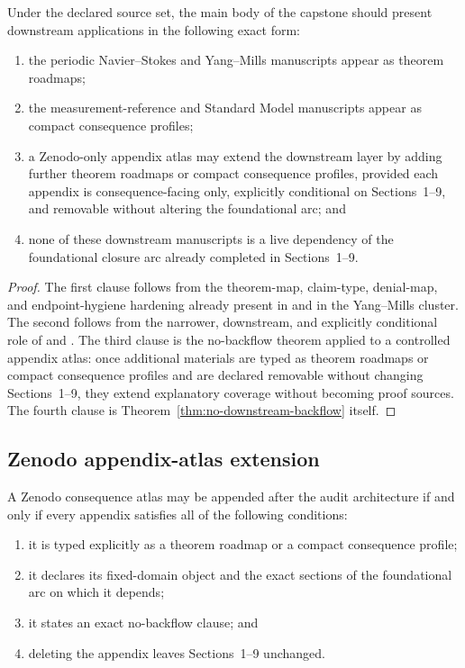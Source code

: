 \begin{theorem}
\label{thm:application-placement}
Under the declared source set, the main body of the capstone should present downstream applications in the following exact form:
\begin{enumerate}
  \item the periodic Navier--Stokes and Yang--Mills manuscripts appear as theorem roadmaps;
  \item the measurement-reference and Standard Model manuscripts appear as compact consequence profiles;
  \item a Zenodo-only appendix atlas may extend the downstream layer by adding further theorem roadmaps or compact consequence profiles, provided each appendix is consequence-facing only, explicitly conditional on Sections~1--9, and removable without altering the foundational arc; and
  \item none of these downstream manuscripts is a live dependency of the foundational closure arc already completed in Sections~1--9.
\end{enumerate}
\end{theorem}

\begin{proof}
The first clause follows from the theorem-map, claim-type, denial-map, and endpoint-hygiene hardening already present in \nsdoc{} and in the Yang--Mills cluster. The second follows from the narrower, downstream, and explicitly conditional role of \measurementdoc{} and \structuradoc{}. The third clause is the no-backflow theorem applied to a controlled appendix atlas: once additional materials are typed as theorem roadmaps or compact consequence profiles and are declared removable without changing Sections~1--9, they extend explanatory coverage without becoming proof sources. The fourth clause is Theorem~\ref{thm:no-downstream-backflow} itself.
\end{proof}

\subsection{Zenodo appendix-atlas extension}

\begin{proposition}
\label{prop:zenodo-appendix-atlas-rule}
A Zenodo consequence atlas may be appended after the audit architecture if and only if every appendix satisfies all of the following conditions:
\begin{enumerate}
  \item it is typed explicitly as a theorem roadmap or a compact consequence profile;
  \item it declares its fixed-domain object and the exact sections of the foundational arc on which it depends;
  \item it states an exact no-backflow clause; and
  \item deleting the appendix leaves Sections~1--9 unchanged.
\end{enumerate}
\end{proposition}

